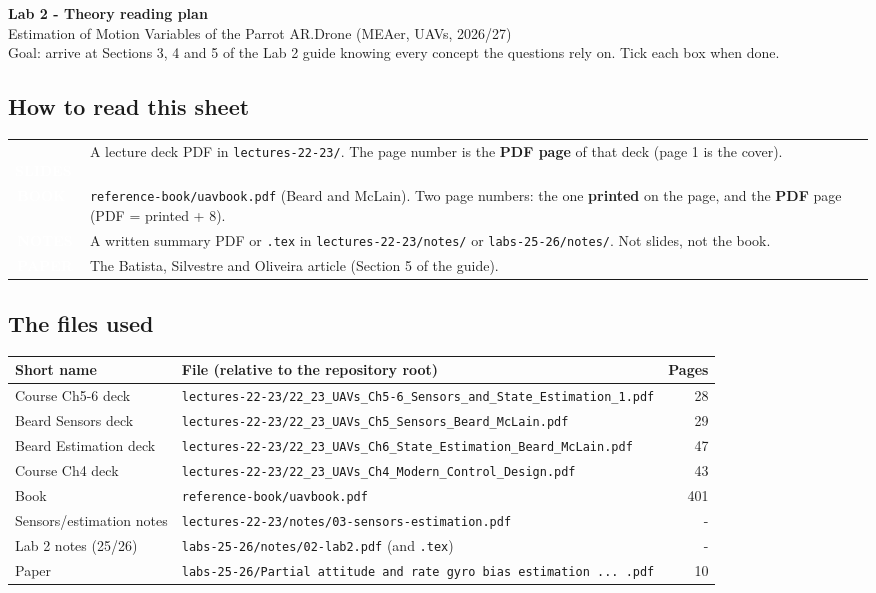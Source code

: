 \documentclass[10pt,a4paper]{article}
\newcommand{\srctag}[2]{\colorbox{#1}{\textcolor{white}{\textbf{\scriptsize\,#2\,}}}}
\newcommand{\SLIDES}{\srctag{slides}{SLIDES}}
\newcommand{\BOOK}{\srctag{book}{BOOK}}
\newcommand{\NOTES}{\srctag{notes}{NOTES}}
\newcommand{\PAPER}{\srctag{paper}{PAPER}}
\begin{document}
{\LARGE\bfseries\color{slides} Lab 2 - Theory reading plan}\\[0.6ex]
{\large Estimation of Motion Variables of the Parrot AR.Drone (MEAer, UAVs, 2026/27)}\\[0.4ex]
{\small Goal: arrive at Sections 3, 4 and 5 of the Lab 2 guide knowing every concept the questions rely on. Tick each box when done.}

\subsection*{How to read this sheet}

\begin{tabularx}{\textwidth}{@{}l X@{}}
\SLIDES & A lecture deck PDF in \texttt{lectures-22-23/}. The page number is the \textbf{PDF page} of that deck (page 1 is the cover).\\[0.5ex]
\BOOK & \texttt{reference-book/uavbook.pdf} (Beard and McLain). Two page numbers: the one \textbf{printed} on the page, and the \textbf{PDF} page (PDF = printed + 8).\\[0.5ex]
\NOTES & A written summary PDF or \texttt{.tex} in \texttt{lectures-22-23/notes/} or \texttt{labs-25-26/notes/}. Not slides, not the book.\\[0.5ex]
\PAPER & The Batista, Silvestre and Oliveira article (Section 5 of the guide).\\
\end{tabularx}

\subsection*{The files used}

\begin{tabularx}{\textwidth}{@{}l X r@{}}
\toprule
Short name & File (relative to the repository root) & Pages\\
\midrule
Course Ch5-6 deck & \texttt{lectures-22-23/22\_23\_UAVs\_Ch5-6\_Sensors\_and\_State\_Estimation\_1.pdf} & 28\\
Beard Sensors deck & \texttt{lectures-22-23/22\_23\_UAVs\_Ch5\_Sensors\_Beard\_McLain.pdf} & 29\\
Beard Estimation deck & \texttt{lectures-22-23/22\_23\_UAVs\_Ch6\_State\_Estimation\_Beard\_McLain.pdf} & 47\\
Course Ch4 deck & \texttt{lectures-22-23/22\_23\_UAVs\_Ch4\_Modern\_Control\_Design.pdf} & 43\\
Book & \texttt{reference-book/uavbook.pdf} & 401\\
Sensors/estimation notes & \texttt{lectures-22-23/notes/03-sensors-estimation.pdf} & -\\
Lab 2 notes (25/26) & \texttt{labs-25-26/notes/02-lab2.pdf} (and \texttt{.tex}) & -\\
Paper & \texttt{labs-25-26/Partial attitude and rate gyro bias estimation ... .pdf} & 10\\
\bottomrule
\end{tabularx}
\end{document}
